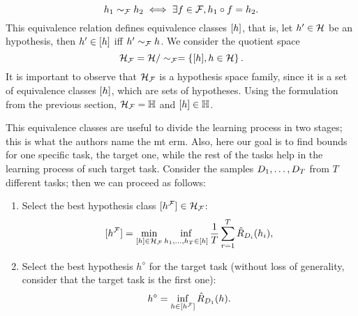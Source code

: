 $$ h_1 \sim_{\mathcal{F}} h_2 \iff \exists f \in \mathcal{F},  h_1 \circ f = h_2 .$$
%
This equivalence relation defines equivalence classes $\lbrack h\rbrack$, that is, let $h' \in \mathcal{H}$ be an hypothesis, then $h' \in \lbrack h\rbrack$ iff $h' \sim_{\mathcal{F}} h$. 
We consider the quotient space 
$$\mathcal{H}_{\mathcal{F}} = \mathcal{H} / \sim_{\mathcal{F}} = \left\{\lbrack h\rbrack, h \in \mathcal{H}\right\}.$$
It is important to observe that $\mathcal{H}_{\mathcal{F}}$ is a hypothesis space family, since it is a set of equivalence classes $\lbrack h\rbrack$, which are sets of hypotheses. Using the formulation from the previous section, $\mathcal{H}_{\mathcal{F}} = \mathbb{H}$ and $\lbrack h\rbrack \in \mathbb{H}$.
%

This equivalence classes are useful to divide the learning process in two stages; this is what the authors name the \acrshort{mt} \acrshort{erm}. 
Also, here our goal is to find bounds for one specific task, the target one, while the rest of the tasks help in the learning process of such target task.
Consider the samples $D_1, \ldots, D_T$ from $T$ different tasks; then we can proceed as follows:
\begin{enumerate}
    \item Select the best hypothesis class $\lbrack h^{\mathcal{F}}\rbrack \in \mathcal{H}_{\mathcal{F}}$:
    \begin{equation}
        \nonumber
        \lbrack h^{\mathcal{F}}\rbrack = \min_{\lbrack h\rbrack \in \mathcal{H}_{\mathcal{F}}} \inf_{h_1, \ldots, h_T \in \lbrack h\rbrack} \frac{1}{T} \sum_{r=1}^T \hat{R}_{D_i}(h_i) ,
    \end{equation}
    \item Select the best hypothesis $h^\diamond$ for the target task (without loss of generality, consider that the target task is the first one):
    \begin{equation}
        \nonumber
        h^\diamond = \inf_{h \in \lbrack h^{\mathcal{F}}\rbrack} \hat{R}_{D_1}(h) .
    \end{equation}
\end{enumerate}

